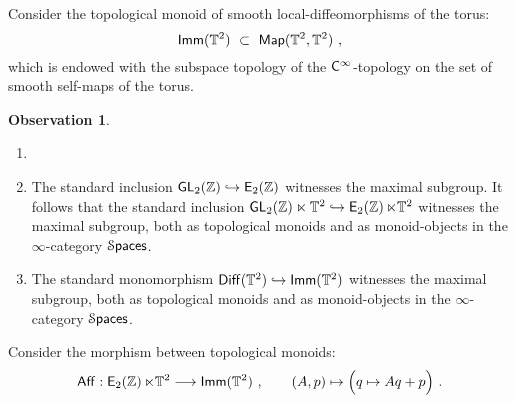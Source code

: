 \documentclass{amsart}
\theoremstyle{definition}
\newtheorem{observation}[theorem]{Observation}
\theoremstyle{remark}
\DeclareMathOperator{\Map}{{\sf Map}}
\DeclareMathOperator{\Diff}{{\sf Diff}}
\DeclareMathOperator{\Spaces}{\cS\mathsf{paces}}
\newcommand{\xra}{\xrightarrow}
\def\sE{\mathsf E}\def\sF{\mathsf F}\def\sG{\mathsf G}\def\sH{\mathsf H}
\DeclareMathOperator{\GL}{\sf GL}
\DeclareMathOperator{\quot}{\sf quot}
\DeclareMathOperator{\Imm}{\sf Imm}
\DeclareMathOperator{\Aff}{\sf Aff}
\DeclareMathOperator{\EZ}{\sE_2(\ZZ)}
\begin{document}


Consider the topological monoid of smooth local-diffeomorphisms of the torus:
\[
\Imm(\TT^2)
~\subset~
\Map(\TT^2 , \TT^2)
~,
\] 
which is endowed with the subspace topology of the $\mathsf C^\infty$-topology on the set of smooth self-maps of the torus.

\begin{observation}
\label{t21}
\begin{enumerate}

\item[~]

\item
The standard inclusion $\GL_2(\ZZ) \hookrightarrow \EZ$ witnesses the maximal subgroup.
It follows that the standard inclusion $\GL_2(\ZZ) \ltimes \TT^2 \hookrightarrow \EZ \ltimes \TT^2$ witnesses the maximal subgroup, both as topological monoids and as monoid-objects in the $\infty$-category $\Spaces$.


\item
The standard monomorphism $\Diff(\TT^2) \hookrightarrow \Imm(\TT^2)$ witnesses the maximal subgroup, both as topological monoids and as monoid-objects in the $\infty$-category $\Spaces$.

\end{enumerate}
\end{observation}






Consider the morphism between topological monoids:
\begin{equation}
\label{e7}
\Aff: \EZ \ltimes \TT^2
\longrightarrow
\Imm(\TT^2)
~,\qquad
(A, p)
\mapsto
\Bigl(
q\mapsto 
Aq + p
\Bigr)
~.
\end{equation}
\end{document}
